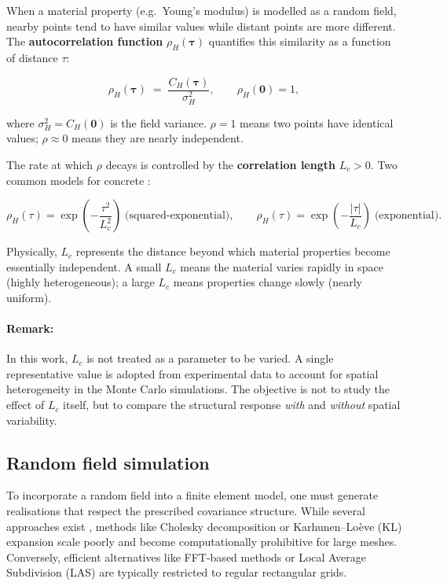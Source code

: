 When a material property (e.g.\ Young's modulus) is modelled as a random field, nearby points tend to have similar values while distant points are more different. The \textbf{autocorrelation function} $\rho_H(\boldsymbol{\tau})$ quantifies this similarity as a function of distance $\tau$:

\begin{equation}
    \rho_H(\boldsymbol{\tau})
    \;=\; \frac{C_H(\boldsymbol{\tau})}{\sigma_H^2},
    \qquad \rho_H(\mathbf{0}) = 1,
    \label{eq:autocorrelation}
\end{equation}

where $\sigma_H^2 = C_H(\mathbf{0})$ is the field variance. $\rho = 1$ means two points have identical values; $\rho \approx 0$ means they are nearly independent.

The rate at which $\rho$ decays is controlled by the \textbf{correlation length} $L_c > 0$. Two common models for concrete \cite{sudret2000, fenton2014}:

\begin{equation}
    \rho_H(\tau) =
    \exp\!\left(-\frac{\tau^2}{L_c^2}\right)
    \;\text{(squared-exponential)},
    \qquad
    \rho_H(\tau) =
    \exp\!\left(-\frac{|\tau|}{L_c}\right)
    \;\text{(exponential)}.
    \label{eq:corr-models}
\end{equation}

Physically, $L_c$ represents the distance beyond which material properties become essentially independent. A small $L_c$ means the material varies rapidly in space (highly heterogeneous); a large $L_c$ means properties change slowly (nearly uniform).

\paragraph{Remark:} In this work, $L_c$ is not treated as a parameter to be varied. A single representative value is adopted from experimental data \cite{delarrard2010} to account for spatial heterogeneity in the Monte Carlo simulations. The objective is not to study the effect of $L_c$ itself, but to compare the structural response \emph{with} and \emph{without} spatial variability.

\subsection{Random field simulation} \label{sec:rf-methods}
To incorporate a random field into a finite element model, one must generate realisations that respect the prescribed covariance structure. While several approaches exist \cite{fenton2014}, methods like Cholesky decomposition or Karhunen--Loève (KL) expansion scale poorly and become computationally prohibitive for large meshes. Conversely, efficient alternatives like FFT-based methods or Local Average Subdivision (LAS) are typically restricted to regular rectangular grids.

